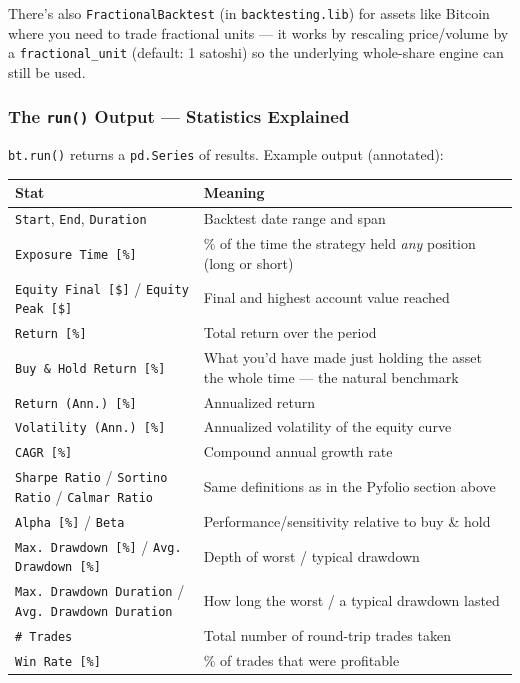 \documentclass[12pt,openany]{book}
\theoremstyle{definition}
\theoremstyle{remark}
\begin{document}
There's also \texttt{FractionalBacktest} (in \texttt{backtesting.lib}) for assets like Bitcoin where you need to trade fractional units — it works by rescaling price/volume by a \texttt{fractional\_unit} (default: 1 satoshi) so the underlying whole-share engine can still be used.
\subsubsection{The \texttt{run()} Output — Statistics Explained}

\texttt{bt.run()} returns a \texttt{pd.Series} of results. Example output (annotated):

\begin{longtable}{@{}L{0.46\textwidth}L{0.46\textwidth}@{}}
\toprule
\textbf{Stat} & \textbf{Meaning} \\
\midrule
\texttt{Start}, \texttt{End}, \texttt{Duration} & Backtest date range and span \\
\texttt{Exposure Time [\%]} & \% of the time the strategy held \emph{any} position (long or short) \\
\texttt{Equity Final [\$]} / \texttt{Equity Peak [\$]} & Final and highest account value reached \\
\texttt{Return [\%]} & Total return over the period \\
\texttt{Buy \& Hold Return [\%]} & What you'd have made just holding the asset the whole time — the natural benchmark \\
\texttt{Return (Ann.) [\%]} & Annualized return \\
\texttt{Volatility (Ann.) [\%]} & Annualized volatility of the equity curve \\
\texttt{CAGR [\%]} & Compound annual growth rate \\
\texttt{Sharpe Ratio} / \texttt{Sortino Ratio} / \texttt{Calmar Ratio} & Same definitions as in the Pyfolio section above \\
\texttt{Alpha [\%]} / \texttt{Beta} & Performance/sensitivity relative to buy \& hold \\
\texttt{Max. Drawdown [\%]} / \texttt{Avg. Drawdown [\%]} & Depth of worst / typical drawdown \\
\texttt{Max. Drawdown Duration} / \texttt{Avg. Drawdown Duration} & How long the worst / a typical drawdown lasted \\
\texttt{\# Trades} & Total number of round-trip trades taken \\
\texttt{Win Rate [\%]} & \% of trades that were profitable \\

\end{longtable}
\end{document}
